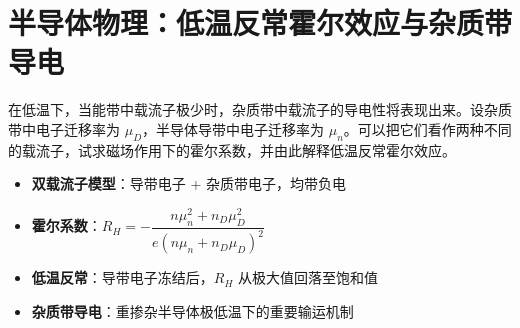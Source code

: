 \section{半导体物理：低温反常霍尔效应与杂质带导电}
\label{sec:anomalous-hall-effect}

\begin{modelbox}[题目：杂质带导电与低温反常霍尔效应]
在低温下，当能带中载流子极少时，杂质带中载流子的导电性将表现出来。设杂质带中电子迁移率为 $\mu_D$，半导体导带中电子迁移率为 $\mu_n$。可以把它们看作两种不同的载流子，试求磁场作用下的霍尔系数，并由此解释低温反常霍尔效应。
\end{modelbox}

\begin{tipbox}[考点快速分析]
\begin{itemize}
    \item \textbf{双载流子模型}：导带电子 + 杂质带电子，均带负电
    \item \textbf{霍尔系数}：$R_H=-\dfrac{n\mu_n^2+n_D\mu_D^2}{e(n\mu_n+n_D\mu_D)^2}$
    \item \textbf{低温反常}：导带电子冻结后，$R_H$ 从极大值回落至饱和值
    \item \textbf{杂质带导电}：重掺杂半导体极低温下的重要输运机制
\end{itemize}
\end{tipbox}

